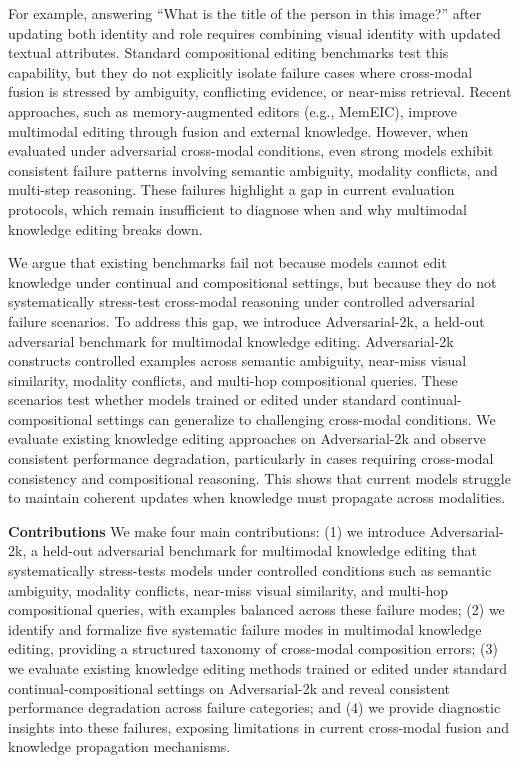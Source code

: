 \documentclass{article}
\begin{document}
\par For example, answering ``What is the title of the person in this image?'' after updating both identity and role requires combining visual identity with updated textual attributes. Standard compositional editing benchmarks test this capability, but they do not explicitly isolate failure cases where cross-modal fusion is stressed by ambiguity, conflicting evidence, or near-miss retrieval. Recent approaches, such as memory-augmented editors (e.g., MemEIC), improve multimodal editing through fusion and external knowledge. However, when evaluated under adversarial cross-modal conditions, even strong models exhibit consistent failure patterns involving semantic ambiguity, modality conflicts, and multi-step reasoning. These failures highlight a gap in current evaluation protocols, which remain insufficient to diagnose when and why multimodal knowledge editing breaks down.

\par We argue that existing benchmarks fail not because models cannot edit knowledge under continual and compositional settings, but because they do not systematically stress-test cross-modal reasoning under controlled adversarial failure scenarios. To address this gap, we introduce Adversarial-2k, a held-out adversarial benchmark for multimodal knowledge editing. Adversarial-2k constructs controlled examples across semantic ambiguity, near-miss visual similarity, modality conflicts, and multi-hop compositional queries. These scenarios test whether models trained or edited under standard continual-compositional settings can generalize to challenging cross-modal conditions. We evaluate existing knowledge editing approaches on Adversarial-2k and observe consistent performance degradation, particularly in cases requiring cross-modal consistency and compositional reasoning. This shows that current models struggle to maintain coherent updates when knowledge must propagate across modalities.


\par \textbf{Contributions} We make four main contributions: (1) we introduce Adversarial-2k, a held-out adversarial benchmark for multimodal knowledge editing that systematically stress-tests models under controlled conditions such as semantic ambiguity, modality conflicts, near-miss visual similarity, and multi-hop compositional queries, with examples balanced across these failure modes; (2) we identify and formalize five systematic failure modes in multimodal knowledge editing, providing a structured taxonomy of cross-modal composition errors; (3) we evaluate existing knowledge editing methods trained or edited under standard continual-compositional settings on Adversarial-2k and reveal consistent performance degradation across failure categories; and (4) we provide diagnostic insights into these failures, exposing limitations in current cross-modal fusion and knowledge propagation mechanisms.
\end{document}
